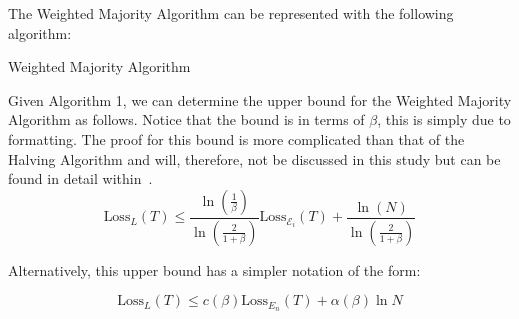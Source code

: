 The Weighted Majority Algorithm can be represented with the following algorithm:
\begin{algorithm}[ht]
    \caption{Weighted Majority Algorithm}\label{weighted_majority_algorithm}
    \begin{algorithmic}[1]
    \end{algorithmic}
\end{algorithm}

Given Algorithm 1, we can determine the upper bound for the Weighted Majority Algorithm as follows. Notice that the bound is in terms of $\beta$, this is simply due to formatting. The  proof for this bound is more complicated than that of the Halving Algorithm and will, therefore, not be discussed in this study but can be found in detail within~\cite{littlestone:1994}.
\begin{equation}
    \text{Loss}_L(T) \leq \frac{\ln (\frac{1}{\beta})}{\ln (\frac{2}{1 + \beta})} \text{Loss}_{\mathcal{E}_i}(T) + \frac{\ln(N)}{\ln(\frac{2}{1+\beta})}
\end{equation}

Alternatively, this upper bound has a simpler notation of the form:

\begin{equation}
    \text{Loss}_L(T) \leq c(\beta)\text{Loss}_{E_n}(T) + \alpha(\beta) \ln N
\end{equation}

